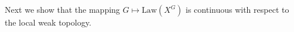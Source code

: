 \documentclass[12pt]{article}
\newcommand{\mb}{\mathbb}
\newcommand{\mc}{\mathcal}
\newcommand{\te}{\text}
\newcommand{\tr}{\textcolor{red}}
\newcommand{\sta}{\mc{X}}							%
\newcommand{\Xf}{X}									%
\newcommand{\poiss}{N}								%
\newcommand{\leb}{\lambda}							%
\newcommand{\Sm}{\ell}								%
\newcommand{\rate}{r}								%
\newcommand{\poissv}[1]{_{#1}}						%
\newcommand{\vind}[1]{_{#1}}						%
\newcommand{\tme}[1]{(#1)}							%
\newcommand{\gind}[1]{^{#1}}						%
\newcommand{\stpara}[1]{_{#1}}						%
\newcommand{\gvpara}[2]{^{#1,#2}}					%
\newcommand{\tmepro}[2]{(#1,#2)}					%
\newcommand{\compen}{a}								%
\newcommand{\tmepoiss}{\alt{\poiss}}				%
\newcommand{\alt}[1]{\tilde{#1}}					%
\newcommand{\law}{\te{Law}}							%
\begin{document}
%
%
%
%
%

Next we show that the mapping \(G \mapsto \law(\Xf\gind{G})\) is continuous with respect to the local weak topology.
\end{document}
